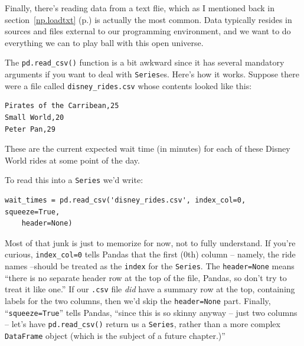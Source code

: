 Finally, there's reading data from a text flie, which as I mentioned back in
section~\ref{np.loadtxt} (p.\pageref{np.loadtxt}) is actually the most common. 
Data typically resides in sources and files external to our programming
environment, and we want to do everything we can to play ball with this open
universe.

The \texttt{pd.read\_csv()} function is a bit awkward since it has several
mandatory arguments if you want to deal with \texttt{Series}es. Here's how it
works. Suppose there were a file called \texttt{disney\_rides.csv} whose
contents looked like this:

\begin{Verbatim}[fontsize=\small,samepage=true,frame=single,framesep=3mm]
Pirates of the Carribean,25
Small World,20
Peter Pan,29
\end{Verbatim}

These are the current expected wait time (in minutes) for each of these Disney
World rides at some point of the day.

To read this into a \texttt{Series} we'd write:

\begin{Verbatim}[fontsize=\small,samepage=true,frame=single,framesep=3mm]
wait_times = pd.read_csv('disney_rides.csv', index_col=0, squeeze=True,
    header=None)
\end{Verbatim}

Most of that junk is just to memorize for now, not to fully understand. If
you're curious, \texttt{index\_col=0} tells Pandas that the first (0th) column
-- namely, the ride names --should be treated as the \texttt{index} for the
\texttt{Series}. The \texttt{header=None} means ``there is no separate header
row at the top of the file, Pandas, so don't try to treat it like one.'' If our
\texttt{.csv} file \textit{did} have a summary row at the top, containing
labels for the two columns, then we'd skip the \texttt{header=None} part.
Finally, ``\texttt{squeeze=True}'' tells Pandas, ``since this is so skinny
anyway -- just two columns -- let's have \texttt{pd.read\_csv()} return us a
\texttt{Series}, rather than a more complex \texttt{DataFrame} object (which is
the subject of a future chapter.)''

